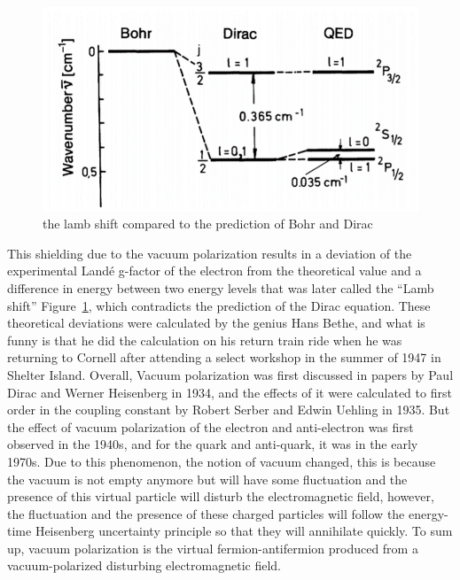 \documentclass{paper}
\begin{document}
\begin{figure}[!th]
	\centering
	\includegraphics[width=0.5\linewidth]{figures/lamb-shift.png}
	\caption{the lamb shift compared to the prediction of Bohr and Dirac}
	\label{fig:lamb-shift}
\end{figure}
This shielding due to the vacuum polarization results in a deviation of the experimental Landé g-factor of the electron from the theoretical value and a difference in energy between two energy levels that was later called the “Lamb shift” Figure~\ref{fig:lamb-shift}, which contradicts the prediction of the Dirac equation. These theoretical deviations were calculated by the genius Hans Bethe, and what is funny is that he did the calculation on his return train ride when he was returning to Cornell after attending a select workshop in the summer of 1947 in Shelter Island.
Overall, Vacuum polarization was first discussed in papers by Paul Dirac and Werner Heisenberg in 1934, and the effects of it were calculated to first order in the coupling constant by Robert Serber and Edwin Uehling in 1935. But the effect of vacuum polarization of the electron and anti-electron was first observed in the 1940s, and for the quark and anti-quark, it was in the early 1970s.
Due to this phenomenon, the notion of vacuum changed, this is because the vacuum is not empty anymore but will have some fluctuation and the presence of this virtual particle will disturb the electromagnetic field, however, the fluctuation and the presence of these charged particles will follow the energy-time Heisenberg uncertainty principle so that they will annihilate quickly.
To sum up, vacuum polarization is the virtual fermion-antifermion produced from a vacuum-polarized disturbing electromagnetic field.
\end{document}
